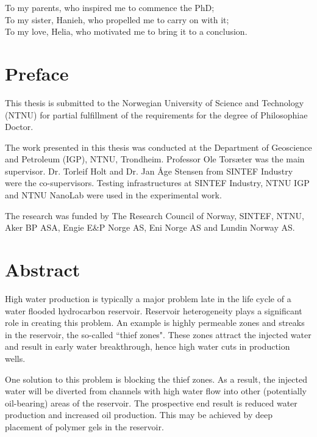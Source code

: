 \begin{dedication}
To my parents, who inspired me to commence the PhD;\\
To my sister, Hanieh, who propelled me to  carry on with it;\\
To my love, Helia, who motivated me to bring it to a conclusion.
\end{dedication}

\clearpage{\thispagestyle{empty}\cleardoublepage}
\setcounter{page}{1}
\chapter*{Preface}

This thesis is submitted to the Norwegian University of Science and Technology (NTNU) for partial fulfillment of the requirements for the degree of Philosophiae Doctor.

The work presented in this thesis was conducted at the Department of Geoscience and Petroleum (IGP), NTNU, Trondheim. Professor Ole Torsæter was the main supervisor. Dr. Torleif Holt and Dr. Jan Åge Stensen from SINTEF Industry were the co-supervisors. Testing infrastructures at SINTEF Industry, NTNU IGP and NTNU NanoLab were used in the experimental work.  

The research was funded by The Research Council of Norway, SINTEF, NTNU, Aker BP ASA, Engie E\&P Norge AS, Eni Norge AS and Lundin Norway AS.


\clearpage{\thispagestyle{empty}\cleardoublepage}
\chapter*{Abstract}

High water production is typically a major problem late in the life cycle of a water flooded hydrocarbon reservoir. Reservoir heterogeneity plays a significant role in creating this problem. An example is highly permeable zones and streaks in the reservoir, the so-called ``thief zones". These zones attract the injected water and result in early water breakthrough, hence high water cuts in production wells. 

One solution to this problem is blocking the thief zones. As a result, the injected water will be diverted from channels with high water flow into other (potentially oil-bearing) areas of the reservoir. The prospective end result is reduced water production and increased oil production.  This may be achieved by deep placement of polymer gels in the reservoir. 

